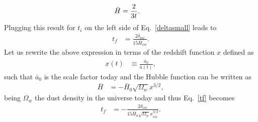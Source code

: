 \documentclass[a4paper,11pt]{article}
\begin{document}
\begin{align}
	\label{hubblefarbounce}
	\Bar{H} & = \frac{2}{3t}
	.\end{align}
Plugging this result for $t_i$ on the left side of Eq.~\eqref{deltasmall} leads to
\begin{align}
	\label{tf}
	t_f & = \frac{2\delta_{ini}}{15\bar{H}_{ini}}
	.\end{align}
Let us rewrite the above expression in terms of the redshift function $x$ defined as
\begin{align}
	x(t) & \equiv  \frac{\bar{a}_0}{\bar{a}(t)}
	,\end{align}
such that $\bar{a}_0$ is the scale factor today and the Hubble function can be written as
\begin{align}
	\label{Hx}
	\bar{H} & = -\bar{H}_0\sqrt{\Omega_w} x^{3/2}
	,\end{align}
being $\Omega_w$ the dust density in the universe today and thus Eq.~\eqref{tf} becomes
\begin{align}
	\label{tfx}
	t_f & = -\frac{2 \delta_{ini}}{15\bar{H}_0 \sqrt{\Omega_w} x_{ini}^{3/2}}
	.\end{align}
\end{document}
